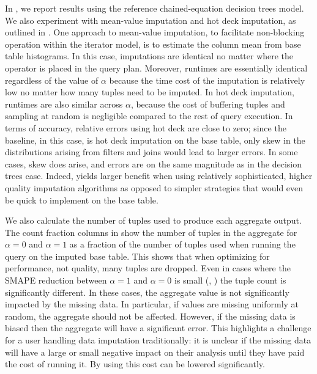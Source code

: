 In , we report results using the reference chained-equation
decision trees model. We also experiment with mean-value imputation and hot
deck imputation, as outlined in . One approach to
mean-value imputation, to facilitate non-blocking operation within the iterator
model, is to estimate the column mean from base table histograms. In this case,
imputations are identical no matter where the operator is placed in the query
plan. Moreover, runtimes are essentially identical regardless of the value of
$\alpha$ because the time cost of the imputation is relatively low no matter
how many tuples need to be imputed. In hot deck imputation, runtimes are also
similar across $\alpha$, because the cost of buffering
tuples and sampling at random is negligible compared to the rest of query
execution. In terms of accuracy, relative errors using hot deck are close to
zero; since the baseline, in this case, is hot deck imputation on the base
table, only skew in the distributions arising from filters and joins would lead
to larger errors. In some cases, skew does arise, and errors are on the same
magnitude as in the decision trees case. Indeed, \ProjectName{} yields larger
benefit when using relatively sophisticated, higher quality imputation
algorithms as opposed to simpler strategies that would even be quick to
implement on the base table.

We also calculate the number of tuples used to produce each aggregate output.
The count fraction columns in  show the number of tuples in the aggregate for $\alpha = 0$ and $\alpha = 1$ as a fraction of the number of tuples used when running the query on the imputed base table.
This shows that when optimizing for performance, not quality, many tuples are dropped.
Even in cases where the SMAPE reduction between $\alpha = 1$ and $\alpha = 0$ is small (, ) the tuple count is significantly different.
In these cases, the aggregate value is not significantly impacted by the missing data. In particular, if values are missing uniformly at random,
the aggregate should not be affected.
However, if the missing data is biased then the aggregate will have a significant error.
This highlights a challenge for a user handling data imputation traditionally: it is unclear if the missing data will have a large or small negative impact on their analysis until they have paid the cost of running it.
By using \ProjectName{} this cost can be lowered significantly.


